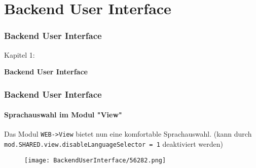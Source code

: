 %

\section{Backend User Interface}
\begin{frame}[fragile]
	\frametitle{Backend User Interface}

	\begin{center}\huge{Kapitel 1:}\end{center}
	\begin{center}\huge{\color{typo3darkgrey}\textbf{Backend User Interface}}\end{center}

\end{frame}

\begin{frame}[fragile]
	\frametitle{Backend User Interface}
	\framesubtitle{Sprachauswahl im Modul "View"}

	Das Modul \texttt{WEB->View} bietet nun eine komfortable Sprachauswahl.\newline
	\smaller
		(kann durch \texttt{mod.SHARED.view.disableLanguageSelector = 1} deaktiviert werden)
	\normalsize

	\begin{figure}
		\texttt{[image: BackendUserInterface/56282.png]}
	\end{figure}

\end{frame}

